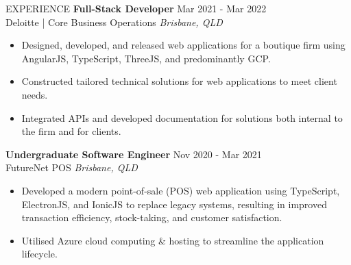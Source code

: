 \documentclass{resume} %
\begin{document}
\begin{rSection}{EXPERIENCE}
\textbf{Full-Stack Developer} \hfill Mar 2021 - Mar 2022\\
Deloitte | Core Business Operations \hfill \textit{Brisbane, QLD}
 \begin{itemize}
    \itemsep -3pt {} 
    \item Designed, developed, and released web applications for a boutique firm using AngularJS, TypeScript, ThreeJS, and predominantly GCP.
    \item Constructed tailored technical solutions for web applications to meet client needs.
    \item Integrated APIs and developed documentation for solutions both internal to the firm and for clients.
 \end{itemize}

\textbf{Undergraduate Software Engineer} \hfill Nov 2020 - Mar 2021\\
FutureNet POS \hfill \textit{Brisbane, QLD}
 \begin{itemize}
    \itemsep -3pt {} 
    \item Developed a modern point-of-sale (POS) web application using TypeScript, ElectronJS, and IonicJS to replace legacy systems, resulting in improved transaction efficiency, stock-taking, and customer satisfaction.
    \item Utilised Azure cloud computing \& hosting to streamline the application lifecycle.
 \end{itemize}

\end{rSection} 
\end{document}
